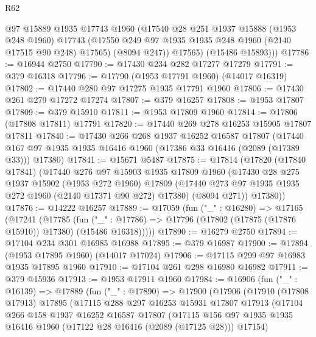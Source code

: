 \begin{lexlean}{R62}
\begin{coremodule}
          @97
          @15889
          @1935
          @17743
          @1960
          (@17540
            @28
            @251
            @1937
            @15888
            (@1953 @248 @1960)
            @17743
            (@17550 @249 @97 @1935 @1935 @248 @1960 (@2140 @17515 @90 @248) @17565)
            (@8094 @247))
          @17565)
        (@15486 @15893)))
@17786 := @16944 @2750
@17790 := @17430 @234 @282 @17277 @17279
@17791 := @379 @16318
@17796 := @17790 (@1953 @17791 @1960) (@14017 @16319)
@17802 := @17440 @280 @97 @17275 @1935 @17791 @1960
@17806 := @17430 @261 @279 @17272 @17274
@17807 := @379 @16257
@17808 := @1953 @17807
@17809 := @379 @15910
@17811 := @1953 @17809 @1960
@17814 := @17806 (@17808 @17811) @17791
@17820 := @17440 @269 @278 @16253 @15905 @17807 @17811
@17840 := @17430
    @266
    @268
    @1937
    @16252
    @16587
    @17807
    (@17440 @167 @97 @1935 @1935 @16416 @1960 (@17386 @33 @16416 (@2089 (@17389 @33))) @17380)
@17841 := @15671 @5487
@17875 := @17814
    (@17820
      (@17840 @17841)
      (@17440
        @276
        @97
        @15903
        @1935
        @17809
        @1960
        (@17430
          @28
          @275
          @1937
          @15902
          (@1953 @272 @1960)
          @17809
          (@17440 @273 @97 @1935 @1935 @272 @1960 (@2140 @17371 @90 @272) @17380)
          (@8094 @271))
        @17380))
@17876 := @14222 @16257
@17889 := @17059
    (fun ("_" : @16280) =>
    @17165
      (@17241
        (@17785
          (fun ("_" : @17786) => @17796 (@17802 (@17875 (@17876 @15910)) @17380) (@15486 @16318)))))
@17890 := @16279 @2750
@17894 := @17104 @234 @301 @16985 @16988
@17895 := @379 @16987
@17900 := @17894 (@1953 @17895 @1960) (@14017 @17024)
@17906 := @17115 @299 @97 @16983 @1935 @17895 @1960
@17910 := @17104 @261 @298 @16980 @16982
@17911 := @379 @15936
@17913 := @1953 @17911 @1960
@17984 := @16906
    (fun ("_" : @16139) =>
    @17889
      (fun ("_" : @17890) =>
      @17900
        (@17906
          (@17910
            (@17808 @17913)
            @17895
            (@17115
              @288
              @297
              @16253
              @15931
              @17807
              @17913
              (@17104
                @266
                @158
                @1937
                @16252
                @16587
                @17807
                (@17115
                  @156
                  @97
                  @1935
                  @1935
                  @16416
                  @1960
                  (@17122 @28 @16416 (@2089 (@17125 @28)))
                  @17154)

\end{coremodule}
\end{lexlean}
